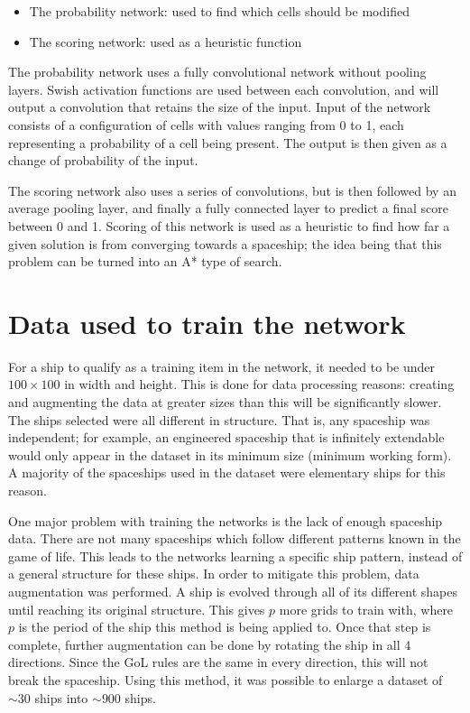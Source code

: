 \documentclass{l4proj}
\begin{document}
\begin{itemize}
    \item The probability network: used to find which cells should be modified
    \item The scoring network: used as a heuristic function
\end{itemize}

The probability network uses a fully convolutional network without pooling layers. Swish activation functions are used between each convolution, and will output a convolution that retains the size of the input. Input of the network consists of a configuration of cells with values ranging from 0 to 1, each representing a probability of a cell being present. The output is then given as a change of probability of the input.

The scoring network also uses a series of convolutions, but is then followed by an average pooling layer, and finally a fully connected layer to predict a final score between 0 and 1. Scoring of this network is used as a heuristic to find how far a given solution is from converging towards a spaceship; the idea being that this problem can be turned into an A* type of search.

\section{Data used to train the network}

For a ship to qualify as a training item in the network, it needed to be under $100 \times 100$ in width and height. This is done for data processing reasons: creating and augmenting the data at greater sizes than this will be significantly slower. The ships selected were all different in structure. That is, any spaceship was independent; for example, an engineered spaceship that is infinitely extendable would only appear in the dataset in its minimum size (minimum working form). A majority of the spaceships used in the dataset were elementary ships for this reason.

One major problem with training the networks is the lack of enough spaceship data. There are not many spaceships which follow different patterns known in the game of life. This leads to the networks learning a specific ship pattern, instead of a general structure for these ships. In order to mitigate this problem, data augmentation was performed. A ship is evolved through all of its different shapes until reaching its original structure. This gives $p$ more grids to train with, where $p$ is the period of the ship this method is being applied to. Once that step is complete, further augmentation can be done by rotating the ship in all 4 directions. Since the GoL rules are the same in every direction, this will not break the spaceship. Using this method, it was possible to enlarge a dataset of $\sim 30$ ships into $\sim 900$ ships.
\end{document}
